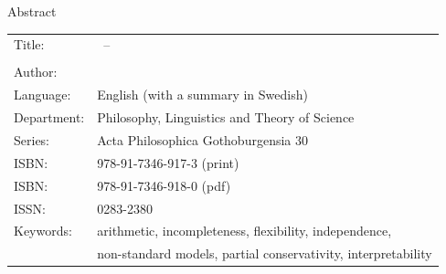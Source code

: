 \documentclass[paper=148mm:209mm,twoside,pagesize=pdftex]{scrartcl}
\newif\ifdraft
\begin{document}
\ifdraft
\makeatletter\CROP@center\makeatother
\fi
\begin{flushleft}
\bgroup
\fontsize{17}{14}\selectfont
{}
Abstract
\egroup
 
\vspace{\baselineskip}
\fontsize{11}{14}\selectfont
\setlength{\tabcolsep}{2.2pt} 
\begin{tabular}{@{}ll}
Title: & \makeatletter{\@title}\makeatother\ -- \\
 & \makeatletter{\@subtitle}\makeatother \\
 
Author: & \makeatletter{\@author}\makeatother \\
  
Language: & English (with a summary in Swedish)\\

Department: & Philosophy, Linguistics and Theory of Science\\
 
Series: & Acta Philosophica Gothoburgensia 30\\
 
ISBN: & 978-91-7346-917-3 (print)\\
 
ISBN: & 978-91-7346-918-0 (pdf)\\
 
ISSN: & 0283-2380\\
 
Keywords: & arithmetic, incompleteness, flexibility, independence,\\
& non-standard models, partial conservativity, interpretability
\end{tabular}
\end{flushleft}
\setlength{\tabcolsep}{6pt} 
\end{document}
